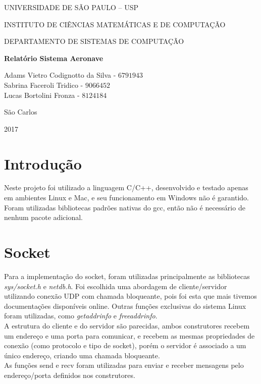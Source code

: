 \documentclass[10pt,a4paper]{article}
\newcommand*\NewPage{\newpage\null\thispagestyle{empty}\newpage}
\begin{document}
\thispagestyle{empty}
\begin{center}
	UNIVERSIDADE DE SÃO PAULO – USP
	
	INSTITUTO DE CIÊNCIAS MATEMÁTICAS E DE COMPUTAÇÃO
	
	DEPARTAMENTO DE SISTEMAS DE COMPUTAÇÃO
	
	\vspace{7cm}
	
	\Large{\textbf{Relatório Sistema Aeronave}}\\
	
	\vspace{6cm}
	
	Adams Vietro Codignotto da Silva - $6791943$ \\ 
	Sabrina Faceroli Tridico - $9066452$\\
	Lucas Bortolini Fronza - $8124184$\\
	
		
	
	\vspace{6cm}
	
	São Carlos
	
	2017
\end{center}

\NewPage
{}

\tableofcontents

\newpage

\section{Introdução}
Neste projeto foi utilizado a linguagem C/C++, desenvolvido e testado apenas em ambientes Linux e Mac, e seu funcionamento em Windows não é garantido. Foram utilizadas bibliotecas padrões nativas do gcc, então não é necessário de nenhum pacote adicional.
\section{Socket}
Para a implementação do socket, foram utilizadas principalmente as bibliotecas \textit{sys/socket.h} e \textit{netdb.h}. Foi escolhida uma abordagem de cliente/servidor utilizando conexão UDP com chamada bloqueante, pois foi esta que mais tivemos documentações disponíveis online. Outras funções exclusivas do sistema Linux foram utilizadas, como \textit{getaddrinfo} e \textit{freeaddrinfo}.\\
A estrutura do cliente e do servidor são parecidas, ambos construtores recebem um endereço e uma porta para comunicar, e recebem as mesmas propriedades de conexão (como protocolo e tipo de socket), porém o servidor é associado a um único endereço, criando uma chamada bloqueante.\\
As funções send e recv foram utilizadas para enviar e receber mensagens pelo endereço/porta definidos nos construtores.
\end{document}
